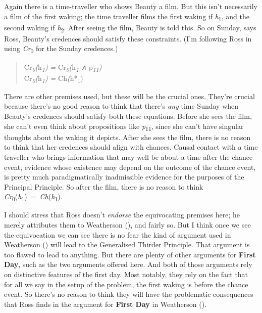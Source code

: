 \documentclass[
  10pt,
  letterpaper,
  DIV=11,
  numbers=noendperiod,
  twoside]{scrartcl}
\begin{document}
Again there is a time-traveller who shows Beauty a film. But this isn't
necessarily a film of the first waking; the time traveller films the
first waking if \emph{h}\textsubscript{1}, and the second waking if
\emph{h}\textsubscript{2}. After seeing the film, Beauty is told this.
So on Sunday, says Ross, Beauty's credences should satisfy these
constraints. (I'm following Ross in using \emph{Cr}\textsubscript{0} for
the Sunday credences.)

\begin{quote}
\noindent *Cr\emph{\textsubscript{0}(}h\emph{\textsubscript{1}) =
}Cr\emph{\textsubscript{0}(}h\emph{\textsubscript{1} ∧
}p\emph{\textsubscript{11})\\
}Cr\emph{\textsubscript{0}(}h\emph{\textsubscript{1}) =
}Ch\emph{(}h*\textsubscript{1})
\end{quote}

There are other premises used, but these will be the crucial ones.
They're crucial because there's no good reason to think that there's
\emph{any} time Sunday when Beauty's credences should satisfy both these
equations. Before she sees the film, she can't even think about
propositions like \emph{p}\textsubscript{11}, since she can't have
singular thoughts about the waking it depicts. After she sees the film,
there is no reason to think that her credences should align with
chances. Causal contact with a time traveller who brings information
that may well be about a time after the chance event, evidence whose
existence may depend on the outcome of the chance event, is pretty much
paradigmatically inadmissible evidence for the purposes of the Principal
Principle. So after the film, there is no reason to think
\emph{Cr}\textsubscript{0}(\emph{h}\textsubscript{1})~=~\emph{Ch}(\emph{h}\textsubscript{1}).

I should stress that Ross doesn't \emph{endorse} the equivocating
premises here; he merely attributes them to Weatherson
(), and fairly so. But I think once
we see the equivocation we can see there is no fear the kind of argument
used in Weatherson () will lead to
the Generalised Thirder Principle. That argument is too flawed to lead
to anything. But there are plenty of other arguments for \textbf{First
Day}, such as the two arguments offered here. And both of those
arguments rely on distinctive features of the first day. Most notably,
they rely on the fact that for all we say in the setup of the problem,
the first waking is before the chance event. So there's no reason to
think they will have the problematic consequences that Ross finds in the
argument for \textbf{First Day} in Weatherson
().
\end{document}
